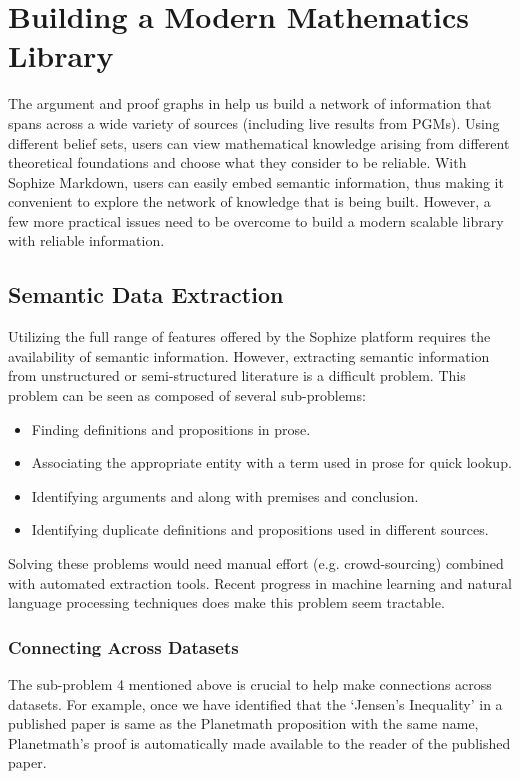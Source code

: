 \documentclass[a4paper]{article}
\begin{document}
\section{Building a Modern Mathematics Library}
\label{sec:lib}
The argument and proof graphs in help us build a network of information that spans across a wide variety of sources (including live results from PGMs). Using different belief sets, users can view mathematical knowledge arising from different theoretical foundations and choose what they consider to be reliable. With Sophize Markdown, users can easily embed semantic information, thus making it convenient to explore the network of knowledge that is being built. However, a few more practical issues need to be overcome to build a modern scalable library with reliable information.

\subsection{Semantic Data Extraction}
Utilizing the full range of features offered by the Sophize platform requires the availability of semantic information. However, extracting semantic information from unstructured or semi-structured literature is a difficult problem. This problem can be seen as composed of several sub-problems:
\begin{itemize}
\item Finding definitions and propositions in prose.
\item Associating the appropriate entity with a term used in prose for quick lookup.
\item Identifying arguments and along with premises and conclusion.
\item \label{prob:dup} Identifying duplicate definitions and propositions used in different sources.
\end{itemize}

Solving these problems would need manual effort (e.g. crowd-sourcing) combined with automated extraction tools. Recent progress in machine learning and natural language processing techniques does make this problem seem tractable.

\subsubsection{Connecting Across Datasets}
The sub-problem 4 mentioned above is crucial to help make connections across datasets. For example, once we have identified that the `Jensen's Inequality' in a published paper is same as the Planetmath proposition with the same name, Planetmath's proof is automatically made available to the reader of the published paper.
\end{document}
